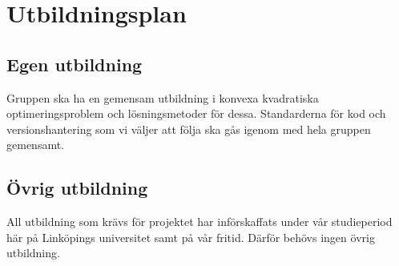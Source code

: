 \section{Utbildningsplan}

\subsection{Egen utbildning}
Gruppen ska ha en gemensam utbildning i konvexa kvadratiska optimeringsproblem och lösningsmetoder för dessa. Standarderna för kod och versionshantering som vi väljer att följa ska gås igenom med hela gruppen gemensamt. 

\subsection{Övrig utbildning}
All utbildning som krävs för projektet har införskaffats under vår studieperiod här på Linköpings universitet samt på vår fritid. Därför behövs ingen övrig utbildning.
